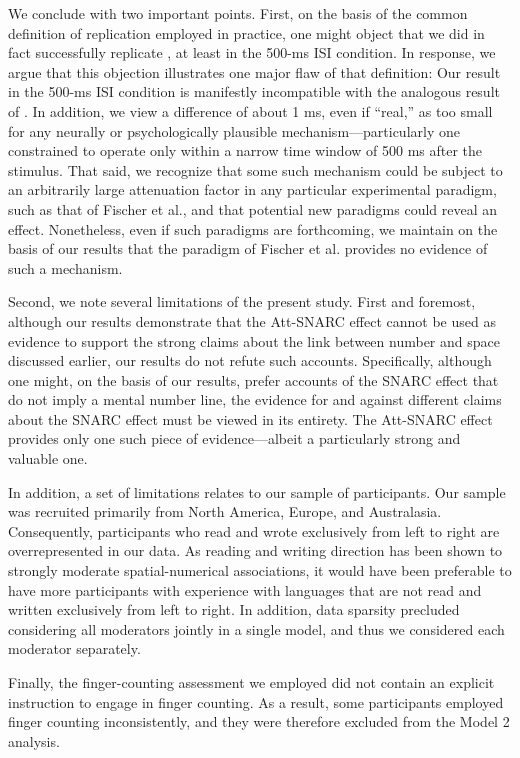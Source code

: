 \documentclass[man,floatsintext]{apa6}
\theoremstyle{definition}
\theoremstyle{definition}
\theoremstyle{definition}
\theoremstyle{remark}
\begin{document}
We conclude with two important points. First, on the basis of the common
definition of replication employed in practice, one might object that we
did in fact successfully replicate \textcite{Fischer:2003ju}, at least
in the 500-ms ISI condition. In response, we argue that this objection
illustrates one major flaw of that definition: Our result in the 500-ms
ISI condition is manifestly incompatible with the analogous result of
\textcite{Fischer:2003ju}. In addition, we view a difference of about 1
ms, even if \enquote{real,} as too small for any neurally or
psychologically plausible mechanism---particularly one constrained to
operate only within a narrow time window of 500 ms after the stimulus.
That said, we recognize that some such mechanism could be subject to an
arbitrarily large attenuation factor in any particular experimental
paradigm, such as that of Fischer et al., and that potential new
paradigms could reveal an effect. Nonetheless, even if such paradigms
are forthcoming, we maintain on the basis of our results that the
paradigm of Fischer et al. provides no evidence of such a mechanism.

Second, we note several limitations of the present study. First and
foremost, although our results demonstrate that the Att-SNARC effect
cannot be used as evidence to support the strong claims about the link
between number and space discussed earlier, our results do not refute
such accounts. Specifically, although one might, on the basis of our
results, prefer accounts of the SNARC effect that do not imply a mental
number line, the evidence for and against different claims about the
SNARC effect must be viewed in its entirety. The Att-SNARC effect
provides only one such piece of evidence---albeit a particularly strong
and valuable one.

In addition, a set of limitations relates to our sample of participants.
Our sample was recruited primarily from North America, Europe, and
Australasia. Consequently, participants who read and wrote exclusively
from left to right are overrepresented in our data. As reading and
writing direction has been shown to strongly moderate spatial-numerical
associations, it would have been preferable to have more participants
with experience with languages that are not read and written exclusively
from left to right. In addition, data sparsity precluded considering all
moderators jointly in a single model, and thus we considered each
moderator separately.

Finally, the finger-counting assessment we employed did not contain an
explicit instruction to engage in finger counting. As a result, some
participants employed finger counting inconsistently, and they were
therefore excluded from the Model 2 analysis.
\end{document}
